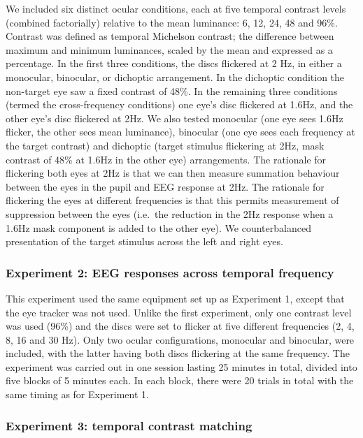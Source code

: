 \documentclass[
]{article}
\begin{document}
We included six distinct ocular conditions, each at five temporal contrast levels (combined factorially) relative to the mean luminance: 6, 12, 24, 48 and 96\%. Contrast was defined as temporal Michelson contrast; the difference between maximum and minimum luminances, scaled by the mean and expressed as a percentage. In the first three conditions, the discs flickered at 2 Hz, in either a monocular, binocular, or dichoptic arrangement. In the dichoptic condition the non-target eye saw a fixed contrast of 48\%. In the remaining three conditions (termed the cross-frequency conditions) one eye's disc flickered at 1.6Hz, and the other eye's disc flickered at 2Hz. We also tested monocular (one eye sees 1.6Hz flicker, the other sees mean luminance), binocular (one eye sees each frequency at the target contrast) and dichoptic (target stimulus flickering at 2Hz, mask contrast of 48\% at 1.6Hz in the other eye) arrangements. The rationale for flickering both eyes at 2Hz is that we can then measure summation behaviour between the eyes in the pupil and EEG response at 2Hz. The rationale for flickering the eyes at different frequencies is that this permits measurement of suppression between the eyes (i.e.~the reduction in the 2Hz response when a 1.6Hz mask component is added to the other eye). We counterbalanced presentation of the target stimulus across the left and right eyes.

\hypertarget{experiment-2-eeg-responses-across-temporal-frequency}{%
\subsubsection{Experiment 2: EEG responses across temporal frequency}\label{experiment-2-eeg-responses-across-temporal-frequency}}

This experiment used the same equipment set up as Experiment 1, except that the eye tracker was not used. Unlike the first experiment, only one contrast level was used (96\%) and the discs were set to flicker at five different frequencies (2, 4, 8, 16 and 30 Hz). Only two ocular configurations, monocular and binocular, were included, with the latter having both discs flickering at the same frequency. The experiment was carried out in one session lasting 25 minutes in total, divided into five blocks of 5 minutes each. In each block, there were 20 trials in total with the same timing as for Experiment 1.

\hypertarget{experiment-3-temporal-contrast-matching}{%
\subsubsection{Experiment 3: temporal contrast matching}\label{experiment-3-temporal-contrast-matching}}
\end{document}
